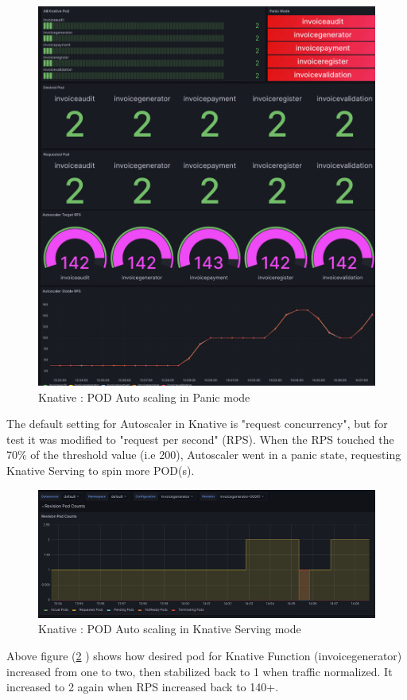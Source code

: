 \documentclass{article}
\begin{document}
\begin{flushleft}
\begin{figure}[h]
    \centering
    \includegraphics[scale=0.5]{images/Grafana/Grafana_Autoscaling_Panic.PNG}
    \caption{Knative : \gls{POD} Auto scaling in Panic mode}
    \label{fig:Pod_Autoscaling_panic}
\end{figure}
\hfill\break
The default setting for Autoscaler in Knative is "request concurrency", but for test it was modified to "request per second" (\gls{RPS}).  When the \gls{RPS} touched the 70\% of the threshold value (i.e 200), Autoscaler went in a panic state, requesting Knative Serving to spin more \gls{POD}(s).   
\break
\begin{figure}[h]
    \centering
    \includegraphics[scale=0.5]{images/Grafana/Grafana_Autoscaling_Knative_Serving_SinglePod}
    \caption{Knative : \gls{POD} Auto scaling in Knative Serving mode}
    \label{fig:Pod_Autoscaling_KnativeServing}
\end{figure}
\hfill\break
Above figure (\ref{fig:Pod_Autoscaling_KnativeServing} ) shows how desired pod for Knative Function (invoicegenerator) increased from one to two, then stabilized back to 1 when traffic normalized. It increased to 2 again when \gls{RPS} increased back to 140+.
    
\end{flushleft}
\pagebreak
\end{document}
